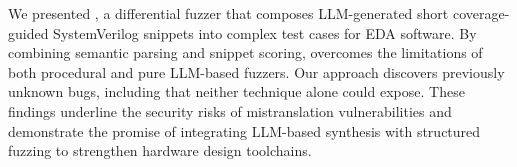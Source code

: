 We presented \ourname, a differential fuzzer that composes LLM-generated short coverage-guided SystemVerilog snippets into complex test cases for EDA software.
By combining semantic parsing and snippet scoring, \ourname overcomes the limitations of both procedural and pure LLM-based fuzzers.
Our approach discovers \numnewbugs previously unknown bugs, including \numnewbugscombi that neither technique alone could expose.
These findings underline the security risks of mistranslation vulnerabilities and demonstrate the promise of integrating LLM-based synthesis with structured fuzzing to strengthen hardware design toolchains.
